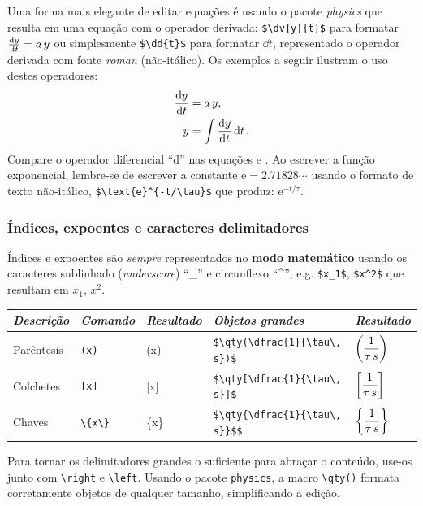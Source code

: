Uma forma mais elegante de editar equações é usando o pacote \emph{physics} que resulta em uma equação com o operador derivada: \verb|$\dv{y}{t}$| para formatar $\dv{y}{t} = a \, y$ ou simplesmente   \verb|$\dd{t}$| para formatar $\dd{t}$, representado o operador derivada com fonte \emph{roman} (não-itálico). Os exemplos a seguir ilustram o uso destes operadores: 
\begin{align} \label{eq:piuBella2}
	\dv{y}{t} &= a \, y, \\  %
	y &= \int \dv{y}{t} \dd{t}.   %
\end{align}
Compare o operador diferencial ``d'' nas equações  e  .
Ao escrever a função exponencial, lembre-se de escrever a constante $\text{e}=2.71828\cdots$ usando o formato de texto não-itálico, \verb|$\text{e}^{-t/\tau}$| que produz: $\text{e}^{-t/\tau}$.


\subsubsection{ Índices, expoentes e caracteres delimitadores}

Índices e expoentes são \emph{sempre} representados no \textbf{modo matemático} usando os caracteres sublinhado (\emph{underscore}) ``\_{}'' e circunflexo ``\^{}'', e.g. \verb|$x_1$|, \verb|$x^2$| que resultam em $x_1$, $x^2$.


\begin{tabular}{lllll}
	\toprule
	\emph{Descrição} & \emph{Comando}  & \emph{Resultado} &\emph{Objetos grandes} & \emph{Resultado}\\
	\midrule
	Parêntesis &\verb|(x)| & (x) &\verb|$\qty(\dfrac{1}{\tau\, s})$| & $\qty(\dfrac{1}{\tau\, s})$\\
	Colchetes &\verb|[x]| & [x]&\verb|$\qty[\dfrac{1}{\tau\, s}]$| & $\qty[\dfrac{1}{\tau\, s}]$\\
	Chaves & \verb|\{x\}| & \{x\}&\verb|$\qty{\dfrac{1}{\tau\, s}}$$| & $\qty{\dfrac{1}{\tau\, s}}$\\
	\bottomrule
\end{tabular}

Para tornar os delimitadores grandes o suficiente para abraçar o conteúdo, use-os junto com \verb|\right| e \verb|\left|. Usando o pacote \texttt{physics},  a macro \verb|\qty()| formata corretamente objetos de qualquer tamanho, simplificando a edição.

